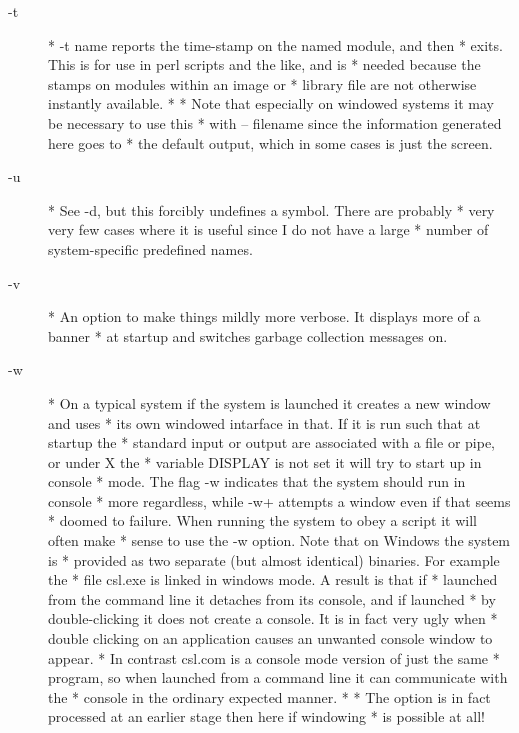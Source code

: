 \documentclass[a4paper,11pt]{article}
\begin{document}
\begin{description}
\item [{\ttfamily -t}] 
          * {\ttfamily -t name} reports the time-stamp on the named module, and then
          * exits. This is for use in perl scripts and the like, and is
          * needed because the stamps on modules within an image or
          * library file are not otherwise instantly available.
          *
          * Note that especially on windowed systems it may be necessary to use this
          * with {\ttfamily -- filename} since the information generated here goes to
          * the default output, which in some cases is just the screen.

\item [{\ttfamily -u}] 
          * See {\ttfamily -d}, but this forcibly undefines a symbol. There are probably
          * very very few cases where it is useful since I do not have a large
          * number of system-specific predefined names.

\item [{\ttfamily -v}] 
          * An option to make things mildly more verbose. It displays more of a banner
          * at startup and switches garbage collection messages on.

\item [{\ttfamily -w}] 
          * On a typical system if the system is launched it creates a new window and uses
          * its own windowed intarface in that. If it is run such that at startup the
          * standard input or output are associated with a file or pipe, or under X the
          * variable {\ttfamily DISPLAY} is not set it will try to start up in console
          * mode. The flag {\ttfamily -w} indicates that the system should run in console
          * more regardless, while {\ttfamily -w+} attempts a window even if that seems
          * doomed to failure. When running the system to obey a script it will often make
          * sense to use the {\ttfamily -w} option. Note that on Windows the system is
          * provided as two separate (but almost identical) binaries. For example the
          * file {\ttfamily csl.exe} is linked in windows mode. A result is that if
          * launched from the command line it detaches from its console, and if launched
          * by double-clicking it does not create a console. It is in fact very ugly when
          * double clicking on an application causes an unwanted console window to appear.
          * In contrast {\ttfamily csl.com} is a console mode version of just the same
          * program, so when launched from a command line it can communicate with the
          * console in the ordinary expected manner.
          *
          * The option is in fact processed at an earlier stage then here if windowing
          * is possible at all!


\end{description}
\end{document}
